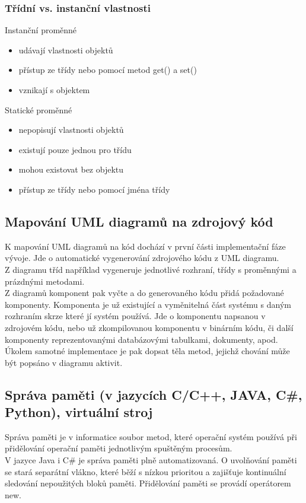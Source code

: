 \documentclass[10pt,a4paper]{article}
\begin{document}
\subsubsection{Třídní vs. instanční vlastnosti}
Instanční proměnné
\begin{itemize}
\item udávají vlastnosti objektů
\item přístup ze třídy nebo pomocí metod get() a set()
\item vznikají s objektem
\end{itemize}
Statické proměnné
\begin{itemize}
\item nepopisují vlastnosti objektů
\item existují pouze jednou pro třídu
\item mohou existovat bez objektu
\item přístup ze třídy nebo pomocí jména třídy
\end{itemize}
\subsection{Mapování UML diagramů na zdrojový kód}
K mapování UML diagramů na kód dochází v první části implementační fáze vývoje. Jde o automatické vygenerování zdrojového kódu z UML diagramu. \\
Z diagramu tříd například vygeneruje jednotlivé rozhraní, třídy s proměnnými a prázdnými metodami.\\
Z diagramů komponent pak vyčte a do generovaného kódu přidá požadované komponenty. Komponenta je už existující a vyměnitelná část systému s daným rozhraním skrze které jí systém používá. Jde o komponentu napsanou v zdrojovém kódu, nebo už zkompilovanou komponentu v binárním kódu, či další komponenty reprezentovanými databázovými tabulkami, dokumenty, apod. \\
Úkolem samotné implementace je pak dopsat těla metod, jejichž chování může být popsáno v diagramu aktivit.
\subsection{Správa paměti (v jazycích C/C++, JAVA, C\#, Python), virtuální stroj}
Správa paměti je v informatice soubor metod, které operační systém používá při přidělování operační paměti jednotlivým spuštěným procesům. \\
V jazyce Java i C\# je správa paměti plně automatizovaná. O uvolňování paměti se stará separátní vlákno, které běží s nízkou prioritou a zajišťuje kontinuální sledování nepoužitých bloků paměti. Přidělování paměti se provádí operátorem new.
\end{document}
